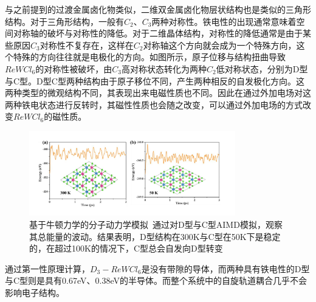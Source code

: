 与之前提到的过渡金属卤化物类似，二维双金属卤化物层状结构也是类似的三角形结构。对于三角形结构，一般有$C_{2}\text{、}C_{3}$两种对称性。铁电性的出现通常意味着空间对称轴的破坏与对称性的降低。对于二维晶体结构，对称性的降低通常是由于某些原因$C_{3}$对称性不复存在，这样在$C_{2}$对称轴这个方向就会成为一个特殊方向，这个特殊的方向往往就是电极化的方向。如图所示，原子位移与结构扭曲导致$ReWCl_{6}$的对称性被破坏，由$C_{3}$高对称状态转化为两种$C_{2}$低对称状态，分别为D型与C型。D型C型两种结构由于原子移位不同，产生两种相反的自发极化方向。这两种类型的微观结构不同，其表现出来电磁性质也不同。因此在通过外加电场对这两种铁电状态进行反转时，其磁性性质也会随之改变，可以通过外加电场的方式改变$ReWCl_{6}$的磁性质。

\begin{figure}[h]
    \centering
\includegraphics[width=0.8\textwidth]{./pic/020.png}
\caption{基于牛顿力学的分子动力学模拟\ 通过对D型与C型AIMD模拟，观察其总能量的波动。结果表明，D型结构在300K与C型在50K下是稳定的，在超过100K的情况下，C型总会自发向D型转变}

\label{dog020}
\end{figure}

通过第一性原理计算，$D_{3}-ReWCl_{6}$是没有带隙的导体，而两种具有铁电性的D型与C型则是具有0.67eV、0.38eV的半导体。而整个系统中的自旋轨道耦合几乎不会影响电子结构。\cite{ISI:A1993KJ51800070}

